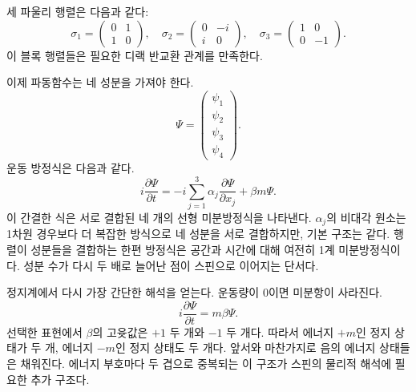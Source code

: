 세 파울리 행렬은 다음과 같다:
\begin{equation}
\sigma_1=
\begin{pmatrix}
0&1\\
1&0
\end{pmatrix},
\quad
\sigma_2=
\begin{pmatrix}
0&-i\\
i&0
\end{pmatrix},
\quad
\sigma_3=
\begin{pmatrix}
1&0\\
0&-1
\end{pmatrix}.
\end{equation}
이 블록 행렬들은 필요한 디랙 반교환 관계를 만족한다.

이제 파동함수는 네 성분을 가져야 한다.
\begin{equation}
\Psi=
\begin{pmatrix}
\psi_1\\
\psi_2\\
\psi_3\\
\psi_4
\end{pmatrix}.
\end{equation}
운동 방정식은 다음과 같다.
\begin{equation}
i\frac{\partial\Psi}{\partial t}
=
-i\sum_{j=1}^{3}\alpha_j
\frac{\partial\Psi}{\partial x_j}
+\beta m\Psi.
\end{equation}
이 간결한 식은 서로 결합된 네 개의 선형 미분방정식을 나타낸다. \(\alpha_j\)의 비대각 원소는 1차원 경우보다 더 복잡한 방식으로 네 성분을 서로 결합하지만, 기본 구조는 같다. 행렬이 성분들을 결합하는 한편 방정식은 공간과 시간에 대해 여전히 1계 미분방정식이다. 성분 수가 다시 두 배로 늘어난 점이 스핀으로 이어지는 단서다.

\begin{classroomqa}
\end{classroomqa}

정지계에서 다시 가장 간단한 해석을 얻는다. 운동량이 0이면 미분항이 사라진다.
\begin{equation}
i\frac{\partial\Psi}{\partial t}=m\beta\Psi.
\end{equation}
선택한 표현에서 \(\beta\)의 고윳값은 \(+1\) 두 개와 \(-1\) 두 개다. 따라서 에너지 \(+m\)인 정지 상태가 두 개, 에너지 \(-m\)인 정지 상태도 두 개다. 앞서와 마찬가지로 음의 에너지 상태들은 채워진다. 에너지 부호마다 두 겹으로 중복되는 이 구조가 스핀의 물리적 해석에 필요한 추가 구조다.

